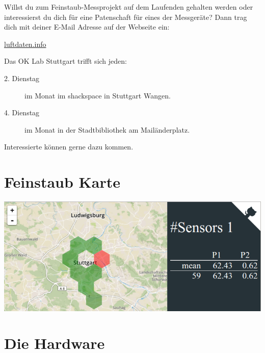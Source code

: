\documentclass[
notumble,
]{leaflet}
\begin{document}
Willst du zum Feinstaub-Messprojekt auf dem Laufenden gehalten werden oder interessierst du dich für eine Patenschaft für eines der Messgeräte?
Dann trag dich mit deiner E-Mail Adresse auf der Webseite ein:

\href{http://luftdaten.info/}{luftdaten.info}

Das OK Lab Stuttgart trifft sich jeden:
\begin{description}
 \item [2. Dienstag] im Monat im shackspace in Stuttgart Wangen.
 \item [4. Dienstag] im Monat in der Stadtbibliothek am Mailänderplatz.
\end{description}

Interessierte können gerne dazu kommen.

\section{Feinstaub Karte}
\includegraphics[width=\textwidth]{images/feinstaubmap}

\newpage 
\section{Die Hardware}
\end{document}
